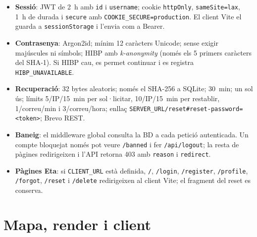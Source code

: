\documentclass[10pt,a4paper]{article}
\begin{document}
\begin{itemize}[nosep]
  \item \textbf{Sessió}: JWT de 2~h amb \texttt{id} i \texttt{username}; cookie
        \texttt{httpOnly}, \texttt{sameSite=lax}, 1~h de durada i \texttt{secure} amb
        \texttt{COOKIE\_SECURE=production}. El client Vite el guarda a
        \texttt{sessionStorage} i l'envia com a Bearer.
  \item \textbf{Contrasenya}: Argon2id; mínim 12 caràcters Unicode; sense exigir
        majúscules ni símbols; HIBP amb \emph{k-anonymity} (només els 5 primers
        caràcters del SHA-1). Si HIBP cau, es permet continuar i es registra
        \texttt{HIBP\_UNAVAILABLE}.
  \item \textbf{Recuperació}: 32 bytes aleatoris; només el SHA-256 a SQLite; 30~min;
        un sol ús; límits 5/IP/15~min per sol·licitar, 10/IP/15~min per restablir,
        1/correu/min i 3/correu/hora; enllaç
        \texttt{SERVER\_URL/reset\#reset-password=<token>}; Brevo REST.
  \item \textbf{Baneig}: el middleware global consulta la BD a cada petició
        autenticada. Un compte bloquejat només pot veure \texttt{/banned} i fer
        \texttt{/api/logout}; la resta de pàgines redirigeixen i l'API retorna 403 amb
        \texttt{reason} i \texttt{redirect}.
  \item \textbf{Pàgines Eta}: si \texttt{CLIENT\_URL} està definida, \texttt{/},
        \texttt{/login}, \texttt{/register}, \texttt{/profile}, \texttt{/forgot},
        \texttt{/reset} i \texttt{/delete} redirigeixen al client Vite; el fragment del
        reset es conserva.
\end{itemize}

\section{Mapa, render i client}
\end{document}
